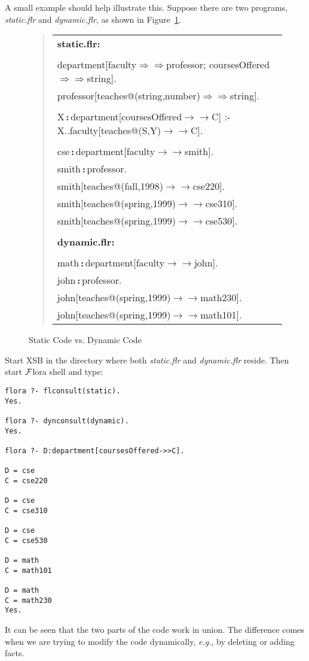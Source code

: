 \documentclass[11pt]{article}
\newcommand{\isa}{\,{\bf{:}}\,}
\newcommand{\mvd}{\ensuremath{{\rightarrow\!\!\!\!\rightarrow}}}  %
\newcommand{\Mvd}{\ensuremath{{\Rightarrow\!\!\!\!\Rightarrow}}}  %
\newcommand{\FLORA}{{\mbox{${\cal F}${\sc lora}}}\xspace}
\begin{document}
A small example should help illustrate this. Suppose there are two
programs, {\it static.flr} and {\it dynamic.flr}, as shown in
Figure~\ref{fig:fig-static-dynamic-code}.
\begin{figure}[htb]
\begin{quote}
\begin{tabular}{l}
{\bf static.flr:}\\ \\
department[faculty{\Mvd}professor; coursesOffered{\Mvd}string]. \\
professor[teaches@(string,number){\Mvd}string]. \\
\\
X{\isa}department[coursesOffered{\mvd}C] :-
	X..faculty[teaches@(S,Y){\mvd}C]. \\ \\

cse{\isa}department[faculty{\mvd}smith]. \\
smith{\isa}professor. \\
smith[teaches@(fall,1998){\mvd}cse220]. \\
smith[teaches@(spring,1999){\mvd}cse310]. \\
smith[teaches@(spring,1999){\mvd}cse530]. \\
\\
{\bf dynamic.flr:}\\ \\
math{\isa}department[faculty{\mvd}john]. \\
john{\isa}professor. \\
john[teaches@(spring,1999){\mvd}math230]. \\
john[teaches@(spring,1999){\mvd}math101].
\end{tabular}
\end{quote}
\caption{Static Code vs. Dynamic Code} \label{fig:fig-static-dynamic-code}
\end{figure}
Start XSB in the directory where both \emph{static.flr} and
\emph{dynamic.flr} reside. Then start \FLORA shell and type:
\begin{verbatim}
flora ?- flconsult(static).
Yes.

flora ?- dynconsult(dynamic).
Yes.

flora ?- D:department[coursesOffered->>C].

D = cse
C = cse220

D = cse
C = cse310

D = cse
C = cse530

D = math
C = math101

D = math
C = math230
Yes.
\end{verbatim}
It can be seen that the two parts of the code work in union. The difference
comes when we are trying to modify the code dynamically, {\it e.g.}, by
deleting or adding facts.
\end{document}
